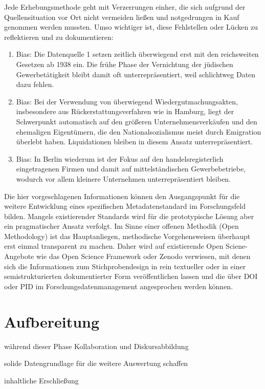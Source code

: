 Jede Erhebungsmethode geht mit Verzerrungen einher, die sich aufgrund der Quellensituation vor Ort nicht vermeiden ließen und notgedrungen in Kauf genommen werden mussten. Umso wichtiger ist, diese Fehlstellen oder Lücken zu reflektieren und zu dokumentieren:

\begin{enumerate}
    \item Bias: Die Datenquelle 1 setzen zeitlich überwiegend erst mit den reichsweiten Gesetzen ab 1938 ein. Die frühe Phase der Vernichtung der jüdischen Gewerbetätigkeit bleibt damit oft unterrepräsentiert, weil schlichtweg Daten dazu fehlen.
    \item Bias: Bei der Verwendung von überwiegend Wiedergutmachungsakten, insbesondere aus Rückerstattungsverfahren wie in Hamburg, liegt der Schwerpunkt automatisch auf den größeren Unternehmensverkäufen und den ehemaligen Eigentümern, die den Nationalsozialismus meist durch Emigration überlebt haben. Liquidationen bleiben in diesem Ansatz unterrepräsentiert. 
    \item Bias: In Berlin wiederum ist der Fokus auf den handelsregisterlich eingetragenen Firmen und damit auf mittelständischen Gewerbebetriebe, wodurch vor allem kleinere Unternehmen unterrepräsentiert bleiben.  
\end{enumerate}

Die hier vorgeschlagenen Informationen können den Ausgangspunkt für die weitere Entwicklung eines spezifischen Metadatenstandard im Forschungsfeld bilden. Mangels existierender Standards wird für die prototypische Lösung aber ein pragmatischer Ansatz verfolgt. Im Sinne einer offenen Methodik (Open Methodology) ist das Hauptanliegen, methodische Vorgehensweisen überhaupt erst einmal transparent zu machen. Daher wird auf existierende Open Sciene-Angebote wie das Open Science Framework oder Zenodo verwiesen, mit denen sich die Informationen zum Stichprobendesign in rein textueller oder in einer semistrukturierten dokumentierter Form veröffentlichen lassen und die über DOI oder PID im Forschungsdatenmanagement angesprochen werden können. 

\section{Aufbereitung}
während dieser Phase Kollaboration und Diskursabbildung

solide Datengrundlage für die weitere Auswertung schaffen

inhaltliche Erschließung

